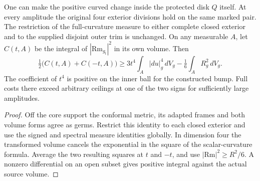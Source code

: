 \begin{proposition}
\label{prop:ed03-protected-conformal-cost}
\leanok
One can make the positive curved change inside the protected disk $Q$
itself. At every amplitude the original four exterior divisions hold on
the same marked pair. The restriction of the full-curvature measure to
either complete closed exterior and to the supplied disjoint outer trim
is unchanged. On any measurable $A$, let $C(t,A)$ be the integral of
$|\mathrm{Rm}_{g_t}|^2$ in its own volume. Then
\[
 \tfrac12\bigl(C(t,A)+C(-t,A)\bigr)
 \ge 3t^4\int_A |du|_g^4\,dV_g-\tfrac16\int_A R_g^2\,dV_g .
\]
The coefficient of $t^4$ is positive on the inner ball for the constructed
bump. Full costs there exceed arbitrary ceilings at one of the two signs
for sufficiently large amplitudes.
\end{proposition}
\begin{proof}
\leanok
Off the core support the conformal metric, its adapted frames and both
volume forms agree as germs. Restrict this identity to each closed
exterior and use the signed and spectral measure identities globally.
In dimension four the transformed volume cancels the exponential in
the square of the scalar-curvature formula. Average the two resulting
squares at $t$ and $-t$, and use $|\mathrm{Rm}|^2\ge R^2/6$.
A nonzero differential on an open subset gives positive integral
against the actual source volume.
\end{proof}
